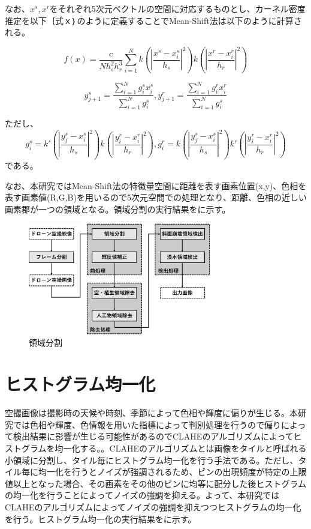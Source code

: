 \documentclass[../Thesis]{subfiles}
\begin{document}
  なお、$x^s,x^r$をそれぞれ5次元ベクトルの空間に対応するものとし、カーネル密度推定を以下｛式ｘ｝のように定義することでMean-Shift法は以下のように計算される。

  \begin{equation}
    f(x) = \frac{c}{Nh_s^2h_r^3} \sum_{i=1}^N k (|\frac{x^s-x_i^s}{h_s}|^2) k (|\frac{x^r-x_i^r}{h_r}|^2)
  \end{equation}

  \begin{equation}
    y_{j+1}^s = \frac{\sum_{i=1}^N g_i^sx_i^s}{\sum_{i=1}^N g_i^s}, y_{j+1}^r = \frac{\sum_{i=1}^N g_i^rx_i^r}{\sum_{i=1}^N g_i^s}
  \end{equation}

  ただし、
  \begin{equation}
    g_i^s = k' (|\frac{y_j^s-x_i^s}{h_s}|^2) k (|\frac{y_i^r-x_i^r}{h_r}|^2), g_i^r = k (|\frac{y_j^s-x_i^s}{h_s}|^2) k' (|\frac{y_i^r-x_i^r}{h_r}|^2)
  \end{equation}
  である。
  
  なお、本研究ではMean-Shift法の特徴量空間に距離を表す画素位置(x,y)、色相を表す画素値(R,G,B)を用いるので5次元空間での処理となり、距離、色相の近しい画素郡が一つの領域となる。領域分割の実行結果をに示す。

  \begin{figure}[h]
		\centering
		\includegraphics[width=8cm]{img/howto3.jpg}
		\caption{領域分割}
		\label{img02}
  \end{figure}


\section{ヒストグラム均一化}
  空撮画像は撮影時の天候や時刻、季節によって色相や輝度に偏りが生じる。本研究では色相や輝度、色情報を用いた指標によって判別処理を行うので偏りによって検出結果に影響が生じる可能性があるのでCLAHEのアルゴリズムによってヒストグラムを均一化する。\cite{art05}。CLAHEのアルゴリズムとは画像をタイルと呼ばれる小領域に分割し、タイル毎にヒストグラム均一化を行う手法である。ただし、タイル毎に均一化を行うとノイズが強調されるため、ビンの出現頻度が特定の上限値以上となった場合、その画素をその他のビンに均等に配分した後ヒストグラムの均一化を行うことによってノイズの強調を抑える。よって、本研究ではCLAHEのアルゴリズムによってノイズの強調を抑えつつヒストグラムの均一化を行う。ヒストグラム均一化の実行結果をに示す。
\end{document}

